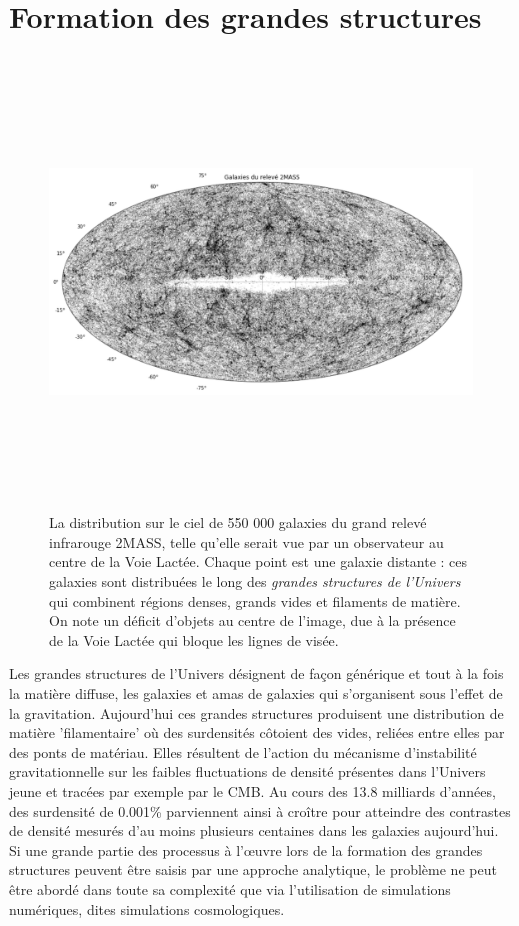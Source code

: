 
\chapter{Formation des grandes structures}
\label{s:struct}
\begin{figure}[htbp]
	\centering
		\includegraphics[height=12cm]{figs/2MASSLSS.png}
		\caption[Le relevé de galaxies 2MASS]{La distribution sur le ciel de 550 000 galaxies du grand relevé infrarouge 2MASS, telle qu'elle serait vue par un observateur au centre de la Voie Lactée. Chaque point est une galaxie distante : ces galaxies sont distribuées le long des \textit{grandes structures de l'Univers} qui combinent régions denses, grands vides et filaments de matière. On note un déficit d'objets au centre de l'image, due à la présence de la Voie Lactée qui bloque les lignes de visée.}
	\label{f:2MASS}
\end{figure}

Les grandes structures de l'Univers désignent de façon générique et tout à la fois la matière diffuse, les galaxies et amas de galaxies qui s'organisent sous l'effet de la gravitation. Aujourd'hui ces grandes structures produisent une distribution de matière 'filamentaire' où des surdensités côtoient des vides, reliées entre elles par des ponts de matériau. Elles résultent de l'action du mécanisme d'instabilité gravitationnelle sur les faibles fluctuations de densité présentes dans l'Univers jeune et tracées par exemple par le CMB. Au cours des 13.8 milliards d'années, des surdensité de 0.001\% parviennent ainsi à croître pour atteindre des contrastes de densité mesurés d'au moins plusieurs centaines dans les galaxies aujourd'hui. Si une grande partie des processus à l'œuvre lors de la formation des grandes structures peuvent être saisis par une approche analytique, le problème ne peut être abordé dans toute sa complexité que via l'utilisation de simulations numériques, dites simulations cosmologiques.


